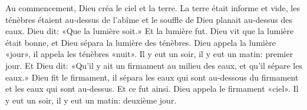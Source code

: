 Au commencement, Dieu créa le ciel et la terre.
La terre était informe et vide,
	les ténèbres étaient au-dessus de l’abîme
	et le souffle de Dieu planait au-dessus des eaux.
Dieu dit: «Que la lumière soit.» Et la lumière fut.
Dieu vit que la lumière était bonne,
	et Dieu sépara la lumière des ténèbres.
Dieu appela la lumière «jour», il appela les ténèbres «nuit».
Il y eut un soir, il y eut un matin: premier jour.
Et Dieu dit: «Qu’il y ait un firmament au milieu des eaux,
	et qu’il sépare les eaux.»
Dieu fit le firmament,
	il sépara les eaux qui sont au-dessous du firmament
	et les eaux qui sont au-dessus. Et ce fut ainsi.
Dieu appela le firmament «ciel».
Il y eut un soir, il y eut un matin: deuxième jour.
